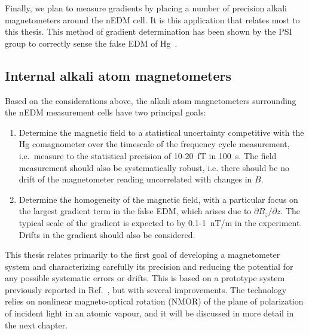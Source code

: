 Finally, we plan to measure gradients by placing a number of precision
alkali magnetometers around the nEDM cell.  It is this application
that relates most to this thesis.  This method of gradient
determination has been shown by the PSI group to correctly sense the
false EDM of Hg~\cite{bib:afach2015}.

\subsection{Internal alkali atom magnetometers}

Based on the considerations above, the alkali atom magnetometers
surrounding the nEDM measurement cells have two principal goals:
\begin{enumerate}
\item Determine the magnetic field to a statistical uncertainty
  competitive with the Hg comagnometer over the timescale of the
  frequency cycle measurement,  i.e.~measure to the statistical
  precision of 10-20~fT in 100~s.  The field measurement should also
  be systematically robust, i.e. there should be no drift of the
  magnetometer reading uncorrelated with changes in $B$.
\item Determine the homogeneity of the magnetic field, with a
  particular focus on the largest gradient term in the false EDM,
  which arises due to $\partial B_z/\partial z$.  The typical scale of
  the gradient is expected to by 0.1-1~nT/m in the experiment.  Drifts
  in the gradient should also be considered.
\end{enumerate}
This thesis relates primarily to the first goal of developing a
magnetometer system and characterizing carefully its precision and
reducing the potential for any possible systematic errors or drifts.
This is based on a prototype system previously reported in
Ref.~\cite{MARTIN201561}, but with several improvements.  The
technology relies on nonlinear magneto-optical rotation (NMOR) of the
plane of polarization of incident light in an atomic vapour, and it
will be discussed in more detail in the next chapter.




